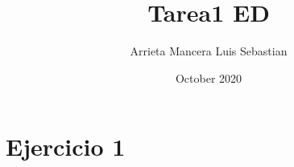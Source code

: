\documentclass{article}
\title{Tarea1 ED}
\author{Arrieta Mancera Luis Sebastian}
\date{October 2020}
\begin{document}
\maketitle

\section{Ejercicio 1}
\end{document}
